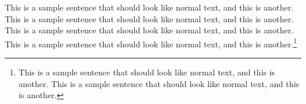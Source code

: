 
This is a sample sentence that should look like normal text, and this
is another. This is a sample sentence that should look like normal
text, and this is another. This is a sample sentence that should look
like normal text, and this is another. This is a sample sentence that
should look like normal text, and this is another.\footnote{This is a
sample sentence that should look like normal text, and this is
another. This is a sample sentence that should look like normal text,
and this is another.}
